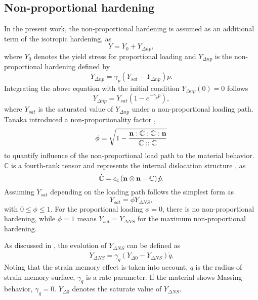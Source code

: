 \documentclass[preprint,5p,twocolumn,11pt,sort&compress]{elsarticle}
\newcommand{\bfn}{{\bf n}}
\begin{document}
\subsection{Non-proportional hardening}
In the present work, the non-proportional hardening is assumed as an additional term of the isotropic hardening, as
\begin{equation}
Y = {Y_0} + {Y_{\Delta np}},
\end{equation}
where $Y_0$ denotes the yield stress for proportional loading and ${Y_{\Delta np}}$ is the non-proportional hardening defined by
\begin{equation}
{\dot Y_{\Delta np}} = {\gamma _p}\left( {{Y_{sat}} - {Y_{\Delta np}}} \right)\dot p.
\end{equation}
Integrating the above equation with the initial condition ${Y_{\Delta np}}(0)=0$ follows
\begin{equation}
{Y_{\Delta np}} = Y_{sat}\left( 1-e^{- \gamma_p p} \right),
\end{equation}
where $Y_{sat}$ is the saturated value of ${Y_{\Delta np}}$ under a non-proportional loading path.
Tanaka introduced a non-proportionality factor \cite{tanaka1994nonproportionality},
\begin{equation}
\phi  = \sqrt {1 - \frac{{\bfn:\mathbb{C}:\mathbb{C}:\bfn}}{{\mathbb{C}::\mathbb{C}}}}
\end{equation}
to quantify influence of the non-proportional load path to the material behavior.  $\mathbb{C}$ is a fourth-rank tensor and represents the internal dislocation structure \cite{tanaka1994nonproportionality}, as
\begin{equation}
\dot {\mathbb{C}} = {c_c}\left( {\bfn \otimes \bfn - \mathbb{C}} \right)\dot p.
\end{equation}
Assuming ${Y_{sat}}$ depending on the loading path follows the simplest form as
\begin{equation}
{Y_{sat}} = \phi {Y_{\Delta NS}},
\end{equation}
with $0 \leq \phi \leq 1$.
For the proportional loading $\phi = 0$, there is no non-proportional hardening, while $\phi = 1$ means ${Y_{sat}} = {Y_{\Delta NS}}$ for the maximum non-proportional hardening.

As discussed in \cite{fang2015cyclic}, the evolution of ${Y_{\Delta NS}}$ can be defined as
\begin{equation}
{\dot Y_{\Delta NS}} = {\gamma _q}\left( {{Y_{\Delta 0}} - {Y_{\Delta NS}}} \right)\dot q.
\end{equation}
Noting that the strain memory effect is taken into account, $q$ is the radius of strain memory surface, ${\gamma _q}$ is a rate parameter.
If the material shows Massing behavior,  ${\gamma _q}=0$. $Y_{\Delta 0} $ denotes the saturate value of $Y_{\Delta NS}$.
\end{document}
